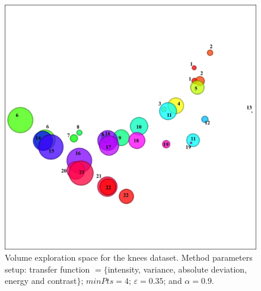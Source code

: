 \begin{figure}[htb!]
    \centering
    \includegraphics[width=0.7\columnwidth]{figs/knees-clusters-tf.jpg} 
     \caption{Volume exploration space for the knees dataset. Method parameters setup: transfer function $=\{$intensity,  variance, absolute deviation, energy and contrast$\}$; $minPts = 4$; $\varepsilon = 0.35$; and $\alpha = 0.9$.}
    \label{fig:knees-tf-clusters}
\end{figure}

